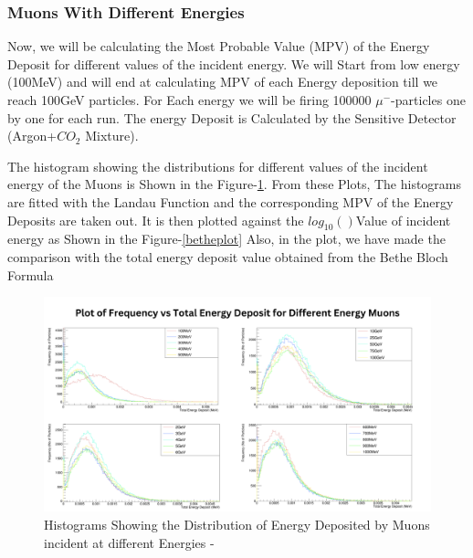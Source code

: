 \documentclass{article}
\begin{document}
\begin{multicols}{2}
\subsubsection{Muons With Different Energies}

Now, we will be calculating the Most Probable Value (MPV) of the
Energy Deposit for different values of the incident energy. We will Start 
from low energy (100MeV) and will end at calculating MPV of each Energy deposition
till we reach 100GeV particles. For Each energy we will be firing 100000 $\mu^-$-particles
one by one for each run. The energy Deposit is Calculated by the Sensitive Detector 
(Argon+$CO_2$ Mixture). 




The histogram showing the distributions for different values of the incident
energy of the Muons is Shown in the Figure-\ref{multihist}. From these Plots, The histograms 
are fitted with the Landau Function and the corresponding MPV of the Energy Deposits are taken out.
It is then plotted against the $log_10 ()$Value of incident energy as Shown in the Figure-\ref{betheplot}
Also, in the plot, we have made the comparison with the total
energy deposit value obtained from the Bethe Bloch Formula







\begin{figure}[ht]
    \centering	
     \includegraphics[width=1.9\columnwidth]{multihist.png}
     \caption{Histograms Showing the Distribution of Energy Deposited by Muons incident at different Energies -\cite{ROOT}}
     \label{multihist}
\end{figure}







\end{multicols}
\end{document}
